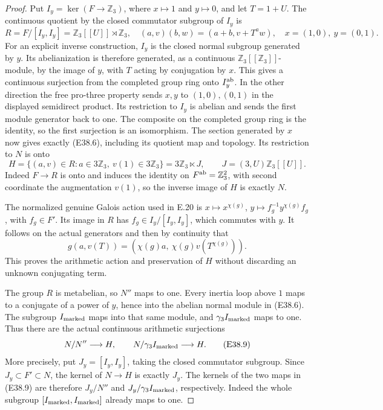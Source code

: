 \begin{proof}
Put $I_y=\ker(F\to\mathbb Z_3)$, where $x\mapsto1$ and
$y\mapsto0$, and let $T=1+U$. The continuous quotient
by the closed commutator subgroup of $I_y$ is
\[
 R=F/[I_y,I_y]=\mathbb Z_3[[U]]\rtimes\mathbb Z_3,
 \quad (a,v)(b,w)=(a+b,v+T^a w),
 \quad x=(1,0),\ y=(0,1).
 \tag{E38.6}
\]
For an explicit inverse construction, $I_y$ is the
closed normal subgroup generated by $y$. Its
abelianization is therefore generated, as a continuous
$\mathbb Z_3[[\mathbb Z_3]]$-module, by the image of
$y$, with $T$ acting by conjugation by $x$. This gives
a continuous surjection from the completed group ring
onto $I_y^{\rm ab}$. In the other direction the free
pro-three property sends $x,y$ to $(1,0),(0,1)$ in
the displayed semidirect product. Its restriction to
$I_y$ is abelian and sends the first module generator
back to one. The composite on the completed group
ring is the identity, so the first surjection is an
isomorphism. The section generated by $x$ now gives
exactly (E38.6), including its quotient map and topology.
Its restriction to $N$ is onto
\[
 H=\{(a,v)\in R:a\in3\mathbb Z_3,\ v(1)\in3\mathbb Z_3\}
   =3\mathbb Z_3\ltimes J,
 \qquad J=(3,U)\mathbb Z_3[[U]] .
 \tag{E38.7}
\]
Indeed $F\to R$ is onto and induces the identity on
$F^{\rm ab}=\mathbb Z_3^2$, with second coordinate the
augmentation $v(1)$, so the inverse image of $H$ is
exactly $N$.

The normalized genuine Galois action used in E.20 is
$x\mapsto x^{\chi(g)}$,
$y\mapsto f_g^{-1}y^{\chi(g)}f_g$, with $f_g\in F'$.
Its image in $R$ has $f_g\in I_y/[I_y,I_y]$, which
commutes with $y$. It follows on the actual generators
and then by continuity that
\[
 g(a,v(T))=(\chi(g)a,\ \chi(g)v(T^{\chi(g)})).
 \tag{E38.8}
\]
This proves the arithmetic action and preservation of
$H$ without discarding an unknown conjugating term.

The group $R$ is metabelian, so $N''$ maps to one.
Every inertia loop above $1$ maps to a conjugate of
a power of $y$, hence into the abelian normal module
in (E38.6). The subgroup $I_{\rm marked}$ maps into
that same module, and $\gamma_3I_{\rm marked}$ maps
to one. Thus there are the actual continuous arithmetic
surjections
\[
 N/N''\longrightarrow H,\qquad
 N/\gamma_3I_{\rm marked}\longrightarrow H.
 \tag{E38.9}
\]
More precisely, put $J_y=[I_y,I_y]$, taking the closed
commutator subgroup. Since $J_y\subset F'\subset N$,
the kernel of $N\to H$ is exactly $J_y$. The kernels
of the two maps in (E38.9) are therefore
$J_y/N''$ and $J_y/\gamma_3I_{\rm marked}$,
respectively. Indeed the whole subgroup
$[I_{\rm marked},I_{\rm marked}]$ already maps to one.


\end{proof}
